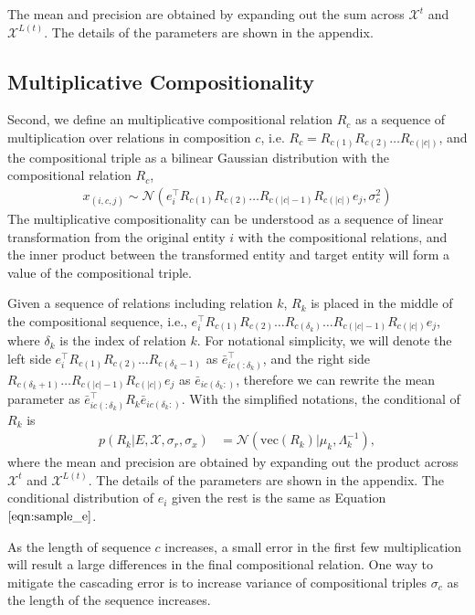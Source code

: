 The mean and precision are obtained by expanding out the sum across $\mathcal{X}^{t}$ and
$\mathcal{X}^{L(t)}$. The details of the parameters are shown in the appendix.


\subsection{Multiplicative Compositionality}
Second, we define an multiplicative compositional relation $R_c$ as a sequence of multiplication over
relations in composition $c$, i.e. $R_c = R_{c(1)} R_{c(2)} \dots R_{c(|c|)}$, and the compositional triple as a
bilinear Gaussian distribution with the compositional relation $R_c$,
\begin{align}
x_{(i, c, j)} \sim \mathcal{N}(e_i^\top R_{c(1)}R_{c(2)} \dots R_{c(|c|-1)}R_{c(|c|)} e_j, \sigma_{c}^2)
\end{align}
The multiplicative compositionality can be understood as a sequence of linear transformation from the original
entity $i$ with the compositional relations, and the inner product between the transformed entity and target
entity will form a value of the compositional triple.

Given a sequence of relations including relation $k$, $R_k$ is placed in the middle of the compositional
sequence, i.e., $e_i^\top R_{c(1)}R_{c(2)} \dots R_{c(\delta_k)} \dots R_{c(|c|-1)}R_{c(|c|)} e_j$, where $
\delta_k$ is the index of relation $k$. For notational simplicity, we will denote the left side $e_i^\top R_{c(1)}
R_{c(2)} \dots R_{c(\delta_k -1)}$ as $\bar{e}_{ic(:\delta_k)}^\top$, and the right side $R_{c(\delta_k + 1)} \dots
R_{c(|c|-1)}R_{c(|c|)} e_j$ as $\bar{e}_{ic(\delta_k:)}$, therefore we can rewrite the mean parameter as $
\bar{e}_{ic(:\delta_k)}^\top R_{k} \bar{e}_{ic(\delta_k:)}$. With the simplified notations, the conditional of $R_k$
is
\begin{align}
p(R_k|E, \mathcal{X}, \sigma_r, \sigma_x)  &= \mathcal{N}(\text{vec}(R_k) | \mu_k, \Lambda_k^{-1}),
\end{align}
where
the mean and precision are obtained by expanding out the product across $\mathcal{X}^{t}$ and
$\mathcal{X}^{L(t)}$. The details of the parameters are shown in the appendix.
The conditional distribution of $e_i$ given the rest is the same as Equation $\ref{eqn:sample_e}$.

As the length of sequence $c$ increases, a small error in the first few multiplication will result a large
differences in the final compositional relation. One way to mitigate the cascading error is to increase variance
of compositional triples $\sigma_c$ as the length of the sequence increases.

